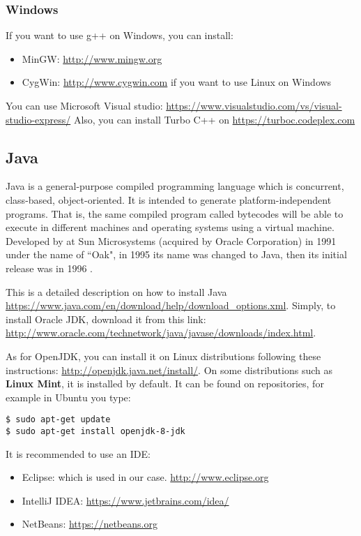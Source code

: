\documentclass{KodeBook}
\begin{document}
\subsubsection{Windows}

If you want to use g++ on Windows, you can install:
\begin{itemize}
	\item MinGW: \url{http://www.mingw.org} 
	\item CygWin: \url{http://www.cygwin.com} if you want to use Linux on Windows
\end{itemize}

You can use Microsoft Visual studio: \url{https://www.visualstudio.com/vs/visual-studio-express/}
Also, you can install Turbo C++ on \url{https://turboc.codeplex.com}

\subsection{Java}


Java is a general-purpose compiled programming language which is concurrent, class-based, object-oriented. 
It is intended to generate platform-independent programs. 
That is, the same compiled program called bytecodes will be able to execute in different machines and operating systems using a virtual machine. 
Developed by  at Sun Microsystems (acquired by Oracle Corporation) in 1991 under the name of ``Oak", in 1995 its name was changed to Java, then its initial release was in 1996 \citep{2014-panigraphy}.

This is a detailed description on how to install Java \url{https://www.java.com/en/download/help/download_options.xml}.
Simply, to install Oracle JDK, download it from this link: \url{http://www.oracle.com/technetwork/java/javase/downloads/index.html}. 

As for OpenJDK, you can install it on Linux distributions following these instructions: \url{http://openjdk.java.net/install/}. 
On some distributions such as \textbf{Linux Mint}, it is installed by default.
It can be found on repositories, for example in Ubuntu you type:
\begin{lstlisting}[style=shellStyle]
$ sudo apt-get update
$ sudo apt-get install openjdk-8-jdk
\end{lstlisting}

It is recommended to use an IDE:
\begin{itemize}
	\item Eclipse: which is used in our case. \url{http://www.eclipse.org}
	\item IntelliJ IDEA: \url{https://www.jetbrains.com/idea/}
	\item NetBeans: \url{https://netbeans.org}
\end{itemize}
\end{document}
